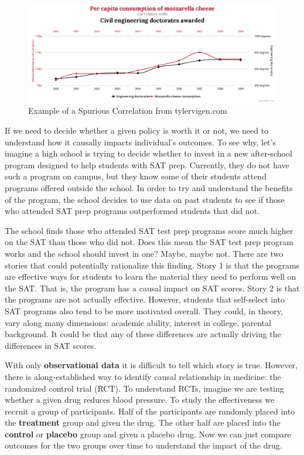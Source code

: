 \documentclass[
]{book}
\begin{document}
\begin{figure}

{\centering \includegraphics[width=1\linewidth]{images/01_spurious} 

}

\caption{Example of a Spurious Correlation from tylervigen.com}\label{fig:spurious}
\end{figure}

If we need to decide whether a given policy is worth it or not, we need to understand how it causally impacts individual's outcomes. To see why, let's imagine a high school is trying to decide whether to invest in a new after-school program designed to help students with SAT prep. Currently, they do not have such a program on campus, but they know some of their students attend programs offered outside the school. In order to try and understand the benefits of the program, the school decides to use data on past students to see if those who attended SAT prep programs outperformed students that did not.

The school finds those who attended SAT test prep programs score much higher on the SAT than those who did not. Does this mean the SAT test prep program works and the school should invest in one? Maybe, maybe not. There are two stories that could potentially rationalize this finding. Story 1 is that the programs are effective ways for students to learn the material they need to perform well on the SAT. That is, the program has a causal impact on SAT scores. Story 2 is that the programs are not actually effective. However, students that self-select into SAT programs also tend to be more motivated overall. They could, in theory, vary along many dimensions: academic ability, interest in college, parental background. It could be that any of these differences are actually driving the differences in SAT scores.

With only \textbf{observational data} it is difficult to tell which story is true. However, there is along-established way to identify causal relationship in medicine: the randomized control trial (RCT). To understand RCTs, imagine we are testing whether a given drug reduces blood pressure. To study the effectiveness we recruit a group of participants. Half of the participants are randomly placed into the \textbf{treatment} group and given the drug. The other half are placed into the \textbf{control} or \textbf{placebo} group and given a placebo drug. Now we can just compare outcomes for the two groups over time to understand the impact of the drug.
\end{document}
